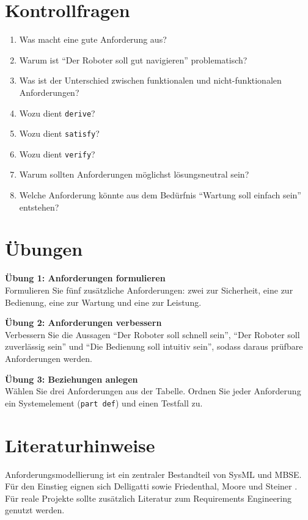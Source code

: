 \section{Kontrollfragen}
\begin{enumerate}
    \item Was macht eine gute Anforderung aus?
    \item Warum ist \enquote{Der Roboter soll gut navigieren} problematisch?
    \item Was ist der Unterschied zwischen funktionalen und nicht-funktionalen Anforderungen?
    \item Wozu dient \texttt{derive}?
    \item Wozu dient \texttt{satisfy}?
    \item Wozu dient \texttt{verify}?
    \item Warum sollten Anforderungen möglichst lösungsneutral sein?
    \item Welche Anforderung könnte aus dem Bedürfnis \enquote{Wartung soll einfach sein} entstehen?
\end{enumerate}

\section{Übungen}
\begin{uebungbox}
\textbf{Übung 1: Anforderungen formulieren}\\
Formulieren Sie fünf zusätzliche Anforderungen: zwei zur Sicherheit, eine zur Bedienung, eine zur Wartung und eine zur Leistung.
\end{uebungbox}

\begin{uebungbox}
\textbf{Übung 2: Anforderungen verbessern}\\
Verbessern Sie die Aussagen \enquote{Der Roboter soll schnell sein}, \enquote{Der Roboter soll zuverlässig sein} und \enquote{Die Bedienung soll intuitiv sein}, sodass daraus prüfbare Anforderungen werden.
\end{uebungbox}

\begin{uebungbox}
\textbf{Übung 3: Beziehungen anlegen}\\
Wählen Sie drei Anforderungen aus der Tabelle. Ordnen Sie jeder Anforderung ein Systemelement (\texttt{part def}) und einen Testfall zu.
\end{uebungbox}

\section{Literaturhinweise}
Anforderungsmodellierung ist ein zentraler Bestandteil von SysML und MBSE. Für den Einstieg eignen sich Delligatti \cite{delligatti2014} sowie Friedenthal, Moore und Steiner \cite{friedenthal2014}. Für reale Projekte sollte zusätzlich Literatur zum Requirements Engineering genutzt werden.
